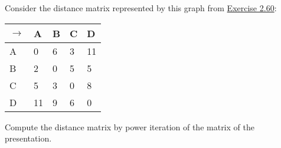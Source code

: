 Consider the distance matrix represented by this graph from \hyperref[E2.60]{Exercise 2.60}:


    \begin{minipage}{0.48\textwidth}
      \centering
      \begin{tabular}{|l|l|l|l|l|}
        \hline

        $\rightarrow$ & A  & B & C & D  \\ \hline
        A             & 0  & 6 & 3 & 11 \\ \hline
        B             & 2  & 0 & 5 & 5  \\ \hline
        C             & 5  & 3 & 0 & 8  \\ \hline
        D             & 11 & 9 & 6 & 0  \\ \hline
      \end{tabular}
    \end{minipage}

    Compute the distance matrix by power iteration of the matrix of the presentation.